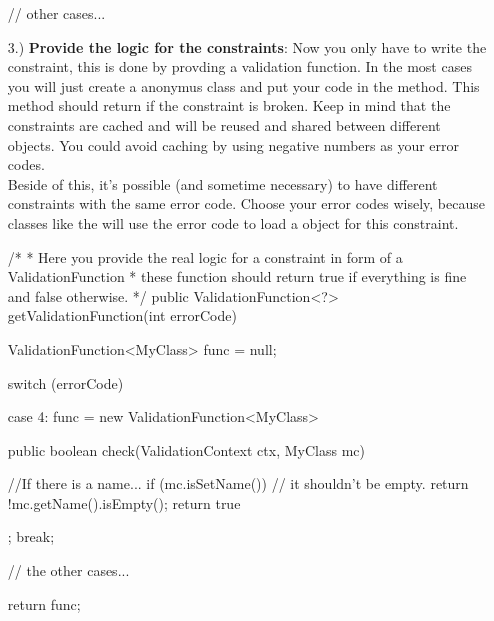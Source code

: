 \begin{itemize}
\begin{example}[style=java, title={Select error codes}]
{{    // other cases...
    
    }
  }
\end{example}

\item[3.)] \textbf{Provide the logic for the constraints}:
Now you only have to write the constraint, this is done by provding a validation function. In the most cases you will just create a anonymus class and put your code in the  method. This method should return  if the constraint is broken. Keep in mind that the constraints are cached and will be reused and shared between different  objects. You could avoid caching by using negative numbers as your error codes.\\
Beside of this, it's possible (and sometime necessary) to have different constraints with the same error code. Choose your error codes wisely, because classes like the  will use the error code to load a  object for this constraint.
\begin{example}[style=java, title={Select error codes}]
  /*
   * Here you provide the real logic for a constraint in form of a ValidationFunction
   * these function should return true if everything is fine and false otherwise.
   */
  public ValidationFunction<?> getValidationFunction(int errorCode) {
  	ValidationFunction<MyClass> func = null;
  	
  	switch (errorCode){
  	case 4:
  		func  = new ValidationFunction<MyClass> {
  		
  			public boolean check(ValidationContext ctx, MyClass mc){
  			
  				//If there is a name...
  				if (mc.isSetName())
  				{
  					// it shouldn't be empty.
  					return !mc.getName().isEmpty();
  				}
  				return true
  			}
  		};
  		break;
  		
  	// the other cases...
  	
  	}
  	
    return func;
  }
\end{example}
\end{itemize}